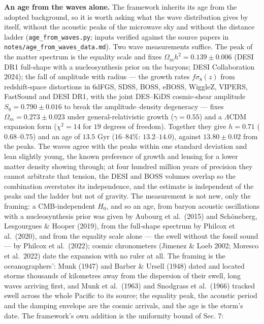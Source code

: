 \documentclass[
  11pt,
]{article}
\begin{document}
\textbf{An age from the waves alone.} The framework inherits its age
from the adopted background, so it is worth asking what the wave
distribution gives by itself, without the acoustic peaks of the
microwave sky and without the distance ladder
(\texttt{age\_from\_waves.py}; inputs verified against the source papers
in \texttt{notes/age\_from\_waves\_data.md}). Two wave measurements
suffice. The peak of the matter spectrum is the equality scale and fixes
\(\Omega_m h^2 = 0.139 \pm 0.006\) (DESI DR1 full-shape with a
nucleosynthesis prior on the baryons; DESI Collaboration 2024); the fall
of amplitude with radius --- the growth rates \(f\sigma_8(z)\) from
redshift-space distortions in 6dFGS, SDSS, BOSS, eBOSS, WiggleZ, VIPERS,
FastSound and DESI DR1, with the joint DES--KiDS cosmic-shear amplitude
\(S_8 = 0.790 \pm 0.016\) to break the amplitude--density degeneracy ---
fixes \(\Omega_m = 0.273 \pm 0.023\) under general-relativistic growth
(\(\gamma = 0.55\)) and a \(\Lambda\)CDM expansion form (\(\chi^2 = 14\)
for \(19\) degrees of freedom). Together they give \(h = 0.71\)
(\(0.68\)--\(0.75\)) and an age of \(13.5\) Gyr (\(16\)--\(84\%\):
\(13.2\)--\(14.0\)), against \(13.80 \pm 0.02\) from the peaks. The
waves agree with the peaks within one standard deviation and lean
slightly young, the known preference of growth and lensing for a lower
matter density showing through; at four hundred million years of
precision they cannot arbitrate that tension, the DESI and BOSS volumes
overlap so the combination overstates its independence, and the estimate
is independent of the peaks and the ladder but not of gravity. The
measurement is not new, only the framing: a CMB-independent \(H_0\), and
so an age, from baryon acoustic oscillations with a nucleosynthesis
prior was given by Aubourg et al.~(2015) and Schöneberg, Lesgourgues \&
Hooper (2019), from the full-shape spectrum by Philcox et al.~(2020),
and from the equality scale alone --- the swell without the fossil sound
--- by Philcox et al.~(2022); cosmic chronometers (Jimenez \& Loeb 2002;
Moresco et al.~2022) date the expansion with no ruler at all. The
framing is the oceanographers': Munk (1947) and Barber \& Ursell (1948)
dated and located storms thousands of kilometres away from the
dispersion of their swell, long waves arriving first, and Munk et
al.~(1963) and Snodgrass et al.~(1966) tracked swell across the whole
Pacific to its source; the equality peak, the acoustic period and the
damping envelope are the cosmic arrivals, and the age is the storm's
date. The framework's own addition is the uniformity bound of Sec. 7:
\end{document}

